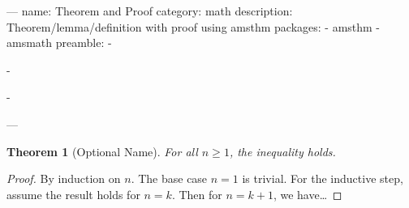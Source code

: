 ---
name: Theorem and Proof
category: math
description: Theorem/lemma/definition with proof using amsthm
packages:
  - amsthm
  - amsmath
preamble:
  - \newtheorem{theorem}{Theorem}[section]
  - \newtheorem{lemma}[theorem]{Lemma}
  - \newtheorem{definition}[theorem]{Definition}
---
\begin{theorem}[Optional Name]
  For all $n \geq 1$, the inequality holds.
\end{theorem}

\begin{proof}
  By induction on $n$. The base case $n = 1$ is trivial.
  For the inductive step, assume the result holds for $n = k$.
  Then for $n = k + 1$, we have\ldots
\end{proof}
